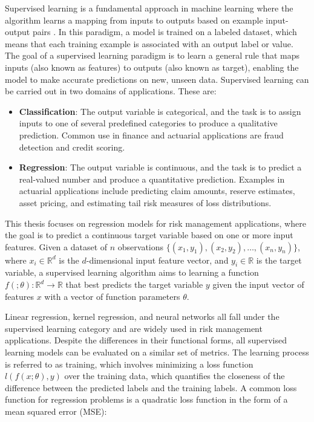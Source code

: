 Supervised learning is a fundamental approach in machine learning where the algorithm learns a mapping from inputs to outputs based on example input-output pairs \cite{galton1886regression}. 
In this paradigm, a model is trained on a labeled dataset, which means that each training example is associated with an output label or value. 
The goal of a supervised learning paradigm is to learn a general rule that maps inputs (also known as features) to outputs (also known as target), enabling the model to make accurate predictions on new, unseen data.
Supervised learning can be carried out in two domains of applications.
These are:

\begin{itemize} 
    \item \textbf{Classification}: The output variable is categorical, and the task is to assign inputs to one of several predefined categories to produce a qualitative prediction. 
    Common use in finance and actuarial applications are fraud detection and credit scoring.
    \item \textbf{Regression}: The output variable is continuous, and the task is to predict a real-valued number and produce a quantitative prediction. 
    Examples in actuarial applications include predicting claim amounts, reserve estimates, asset pricing, and estimating tail risk measures of loss distributions.
\end{itemize}

This thesis focuses on regression models for risk management applications, where the goal is to predict a continuous target variable based on one or more input features.
Given a dataset of $n$ observations $\{(x_1, y_1), (x_2, y_2), \ldots, (x_n, y_n)\}$, where $x_i \in \mathbb{R}^d$ is the $d$-dimensional input feature vector, and $y_i \in \mathbb{R}$ is the target variable, a supervised learning algorithm aims to learning a function $f(;\theta): \mathbb{R}^d \rightarrow \mathbb{R}$ that best predicts the target variable $y$ given the input vector of features $x$ with a vector of function parameters $\theta$.

Linear regression, kernel regression, and neural networks all fall under the supervised learning category and are widely used in risk management applications.
Despite the differences in their functional forms, all supervised learning models can be evaluated on a similar set of metrics.
The learning process is referred to as training, which involves minimizing a loss function $l(f(x; \theta),y)$ over the training data, which quantifies the closeness of the difference between the predicted labels and the training labels.
A common loss function for regression problems is a quadratic loss function in the form of a mean squared error (MSE):

